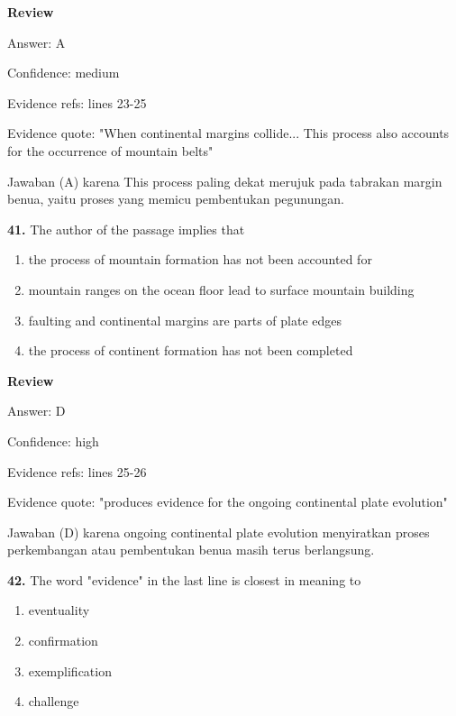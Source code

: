 \documentclass[12pt]{article}
\begin{document}
\par
\begingroup
\setlength{\parskip}{0pt}
\setlength{\parindent}{0pt}
\textbf{Review}\par
Answer: A\par
Confidence: medium\par
Evidence refs: lines 23-25\par
Evidence quote: "When continental margins collide... This process also accounts for the occurrence of mountain belts"\par
Jawaban (A) karena This process paling dekat merujuk pada tabrakan margin benua, yaitu proses yang memicu pembentukan pegunungan.\par
\endgroup
\par
\vspace{0.25\baselineskip}
\noindent\textbf{41.} The author of the passage implies that
\begin{enumerate}[label=(\Alph*),leftmargin=*,itemsep=0.2em]
\item the process of mountain formation has not been accounted for
\item mountain ranges on the ocean floor lead to surface mountain building
\item faulting and continental margins are parts of plate edges
\item the process of continent formation has not been completed
\end{enumerate}
\par
\begingroup
\setlength{\parskip}{0pt}
\setlength{\parindent}{0pt}
\textbf{Review}\par
Answer: D\par
Confidence: high\par
Evidence refs: lines 25-26\par
Evidence quote: "produces evidence for the ongoing continental plate evolution"\par
Jawaban (D) karena ongoing continental plate evolution menyiratkan proses perkembangan atau pembentukan benua masih terus berlangsung.\par
\endgroup
\par
\vspace{0.25\baselineskip}
\noindent\textbf{42.} The word "evidence" in the last line is closest in meaning to
\begin{enumerate}[label=(\Alph*),leftmargin=*,itemsep=0.2em]
\item eventuality
\item confirmation
\item exemplification
\item challenge
\end{enumerate}
\end{document}
